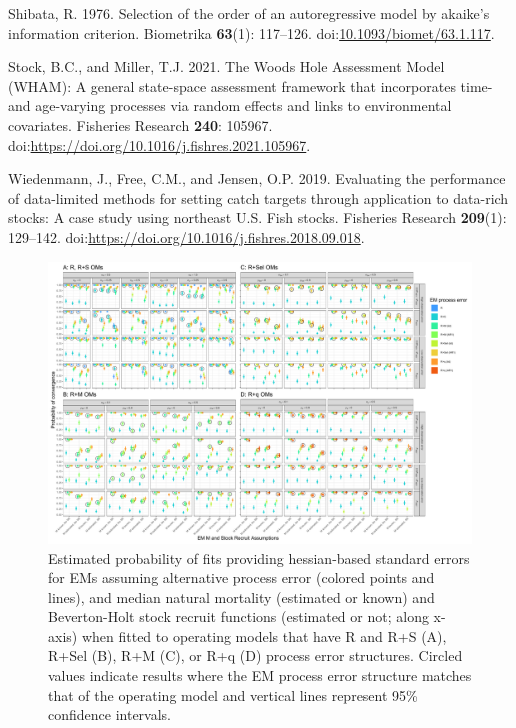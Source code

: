\documentclass[
  12pt,
]{article}
\newlength{\cslhangindent}
\newlength{\cslentryspacingunit} %
\newenvironment{CSLReferences}[2] %
 {%
  \setlength{\parindent}{0pt}
  \ifodd #1
  \let\oldpar\par
  \def\par{\hangindent=\cslhangindent\oldpar}
  \fi
  \setlength{\parskip}{#2\cslentryspacingunit}
 }%
 {}
\begin{document}
\begin{CSLReferences}{1}{0}
\leavevmode{}%
Shibata, R. 1976. Selection of the order of an autoregressive model by
akaike's information criterion. Biometrika \textbf{63}(1): 117--126.
doi:\href{https://doi.org/10.1093/biomet/63.1.117}{10.1093/biomet/63.1.117}.

\leavevmode{}%
Stock, B.C., and Miller, T.J. 2021. The {W}oods {H}ole {A}ssessment
{M}odel ({WHAM}): {A} general state-space assessment framework that
incorporates time- and age-varying processes via random effects and
links to environmental covariates. Fisheries Research \textbf{240}:
105967. doi:\url{https://doi.org/10.1016/j.fishres.2021.105967}.

\leavevmode{}%
Wiedenmann, J., Free, C.M., and Jensen, O.P. 2019. Evaluating the
performance of data-limited methods for setting catch targets through
application to data-rich stocks: A case study using northeast {U.S.}
Fish stocks. Fisheries Research \textbf{209}(1): 129--142.
doi:\url{https://doi.org/10.1016/j.fishres.2018.09.018}.

\end{CSLReferences}

\pagebreak

\clearpage

\begin{landscape}
\begin{figure}
\begin{center}
\includegraphics{type_4_convergence_plots}
\end{center}
\caption{Estimated probability of fits providing hessian-based standard errors for EMs assuming alternative process error (colored points and lines), and median natural mortality (estimated or known) and Beverton-Holt stock recruit functions (estimated or not; along x-axis) when fitted to operating models that have R and R+S (A), R+Sel (B), R+M (C), or R+q (D) process error structures. Circled values indicate results where the EM process error structure matches that of the operating model and vertical lines represent 95\% confidence intervals.}\label{hessian_SE_convergence}
\end{figure}
\end{landscape}
\end{document}
